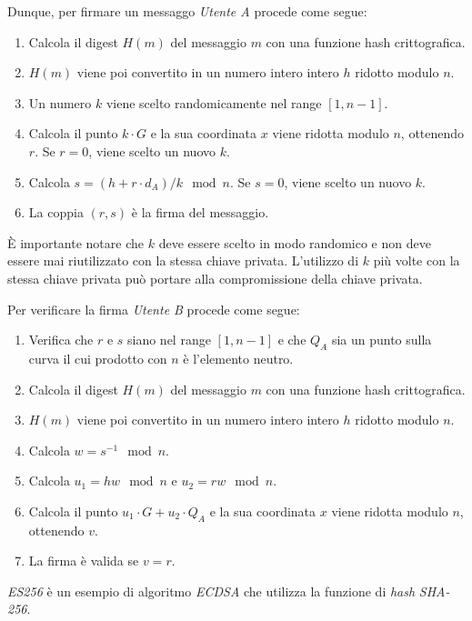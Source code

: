 \noindent Dunque, per firmare un messaggo \emph{Utente A} procede come segue:
\begin{enumerate}
	\item Calcola il digest $H(m)$ del messaggio $m$ con una funzione hash crittografica.
	\item $H(m)$ viene poi convertito in un numero intero intero $h$ ridotto modulo $n$.
	\item Un numero $k$ viene scelto randomicamente nel range $[1, n-1]$.
	\item Calcola il punto $k \cdot G$ e la sua coordinata $x$ viene ridotta modulo $n$, ottenendo $r$. Se $r = 0$, viene scelto un nuovo $k$.
	\item Calcola $s = (h + r \cdot d_A)/k \mod n$. Se $s = 0$, viene scelto un nuovo $k$.
	\item La coppia $(r, s)$ è la firma del messaggio.
\end{enumerate}

\noindent È importante notare che $k$ deve essere scelto in modo randomico e non deve essere mai riutilizzato con la stessa chiave privata.
L'utilizzo di $k$ più volte con la stessa chiave privata può portare alla compromissione della chiave privata.

\noindent Per verificare la firma \emph{Utente B} procede come segue:
\begin{enumerate}
	\item Verifica che $r$ e $s$ siano nel range $[1, n-1]$ e che $Q_A$ sia un punto sulla curva il cui prodotto con $n$ è l'elemento neutro.
	\item Calcola il digest $H(m)$ del messaggio $m$ con una funzione hash crittografica.
	\item $H(m)$ viene poi convertito in un numero intero intero $h$ ridotto modulo $n$.
	\item Calcola $w = s^{-1} \mod n$.
	\item Calcola $u_1 = hw \mod n$ e $u_2 = rw \mod n$.
	\item Calcola il punto $u_1 \cdot G + u_2 \cdot Q_A$ e la sua coordinata $x$ viene ridotta modulo $n$, ottenendo $v$.
	\item La firma è valida se $v = r$.
\end{enumerate}

\noindent \emph{ES256} è un esempio di algoritmo \emph{ECDSA} che utilizza la funzione di \emph{hash} \emph{SHA-256}.


